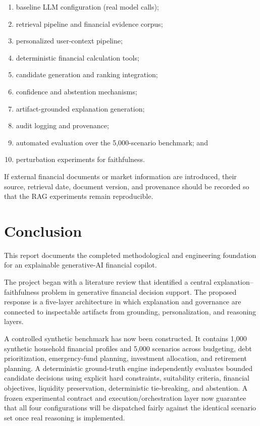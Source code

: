 \documentclass[12pt,a4paper]{article}
\begin{document}
\begin{enumerate}
    \item baseline LLM configuration (real model calls);
    \item retrieval pipeline and financial evidence corpus;
    \item personalized user-context pipeline;
    \item deterministic financial calculation tools;
    \item candidate generation and ranking integration;
    \item confidence and abstention mechanisms;
    \item artifact-grounded explanation generation;
    \item audit logging and provenance;
    \item automated evaluation over the 5,000-scenario benchmark; and
    \item perturbation experiments for faithfulness.
\end{enumerate}

If external financial documents or market information are introduced, their source, retrieval date, document version, and provenance should be recorded so that the RAG experiments remain reproducible.

\section{Conclusion}

This report documents the completed methodological and engineering foundation for an explainable generative-AI financial copilot.

The project began with a literature review that identified a central explanation--faithfulness problem in generative financial decision support. The proposed response is a five-layer architecture in which explanation and governance are connected to inspectable artifacts from grounding, personalization, and reasoning layers.

A controlled synthetic benchmark has now been constructed. It contains 1,000 synthetic household financial profiles and 5,000 scenarios across budgeting, debt prioritization, emergency-fund planning, investment allocation, and retirement planning. A deterministic ground-truth engine independently evaluates bounded candidate decisions using explicit hard constraints, suitability criteria, financial objectives, liquidity preservation, deterministic tie-breaking, and abstention. A frozen experimental contract and execution/orchestration layer now guarantee that all four configurations will be dispatched fairly against the identical scenario set once real reasoning is implemented.
\end{document}

